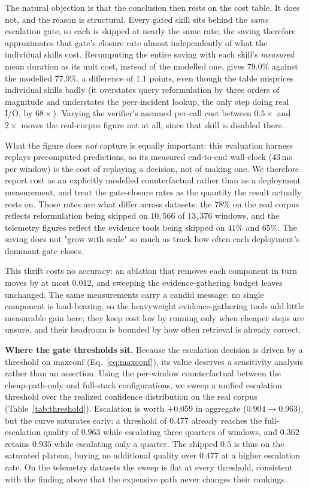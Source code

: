 The natural objection is that the conclusion then rests on the cost table. It
does not, and the reason is structural. Every gated skill sits behind the
\emph{same} escalation gate, so each is skipped at nearly the same rate; the
saving therefore approximates that gate's closure rate almost independently of
what the individual skills cost. Recomputing the entire saving with each skill's
\emph{measured} mean duration as its unit cost, instead of the modelled one,
gives $79.0\%$ against the modelled $77.9\%$, a difference of $1.1$ points, even
though the table misprices individual skills badly (it overstates query
reformulation by three orders of magnitude and understates the peer-incident
lookup, the only step doing real I/O, by $68\times$). Varying the verifier's
assumed per-call cost between $0.5\times$ and $2\times$ moves the real-corpus
figure not at all, since that skill is disabled there.

What the figure does \emph{not} capture is equally important: this evaluation
harness replays precomputed predictions, so its measured end-to-end wall-clock
($43$\,ms per window) is the cost of replaying a decision, not of making one. We
therefore report cost as an explicitly modelled counterfactual rather than as a
deployment measurement, and treat the gate-closure rates as the quantity the
result actually rests on. Those rates are what differ across datasets: the $78\%$
on the real corpus reflects reformulation being skipped on $10{,}566$ of
$13{,}376$ windows, and the telemetry figures reflect the evidence tools being
skipped on $41\%$ and $65\%$. The saving does not "grow with scale" so much as
track how often each deployment's dominant gate closes.

This thrift costs no accuracy: an ablation that
removes each component in turn moves  by at most $0.012$, and sweeping the
evidence-gathering budget leaves  unchanged. The same measurements carry a candid message: no single component is load-bearing, so the heavyweight evidence-gathering tools add little measurable \hit{} gain here; they keep cost low by running only when cheaper steps are unsure, and their headroom is bounded by how often retrieval is already correct.

\smallskip
\noindent\textbf{Where the gate thresholds sit.} Because the escalation decision
is driven by a threshold on $\mathrm{maxconf}$ (Eq.~\ref{eq:maxconf}), its value
deserves a sensitivity analysis rather than an assertion. Using the per-window
counterfactual between the cheap-path-only and full-stack configurations, we
sweep a unified escalation threshold over the realized confidence distribution on
the real corpus (Table~\ref{tab:threshold}). Escalation is worth $+0.059$ 
in aggregate ($0.904\!\rightarrow\!0.963$), but the curve saturates early: a
threshold of $0.477$ already reaches the full-escalation quality of $0.963$ while
escalating three quarters of windows, and $0.362$ retains $0.935$ while escalating
only a quarter. The shipped $0.5$ is thus on the saturated plateau, buying no
additional quality over $0.477$ at a higher escalation rate. On the telemetry
datasets the sweep is flat at every threshold, consistent with the finding above
that the expensive path never changes their rankings.

